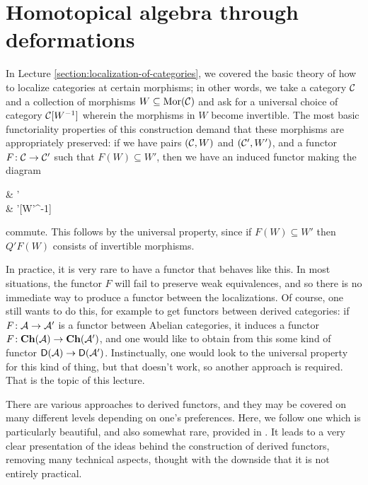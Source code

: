 
\section{Homotopical algebra through deformations}
In Lecture \ref{section:localization-of-categories}, we covered the basic theory of how to localize categories at certain morphisms; in other words, we take a category \(\mathcal{C}\) and
a collection of morphisms \(W\subseteq\operatorname{Mor}(\mathcal{C})\) and ask for a universal choice of category \(\mathcal{C}[W^{-1}]\) wherein the morphisms in \(W\) become invertible. The most basic functoriality
properties of this construction demand that these morphisms are appropriately preserved: if we have pairs \((\mathcal{C},W)\) and \((\mathcal{C}',W')\), and a functor \(F\!:\mathcal{C}\to\mathcal{C}'\) such that \(F(W)\subseteq W'\),
then we have an induced functor making the diagram
\begin{diagram*}
	\calC\ar[r,"F"]\ar[d,"Q"'] & \calC'\ar[d,"Q'"] \\
	\calC[W^{-1}]\ar[r,dashed] & \calC'[W'^{-1}]
\end{diagram*}
commute. This follows by the universal property, since if \(F(W)\subseteq W'\) then \(Q'F(W)\) consists of invertible morphisms.

In practice, it is very rare to have a functor that behaves like this. In most situations, the functor \(F\) will fail to preserve weak equivalences, and so there is no immediate way
to produce a functor between the localizations. Of course, one still wants to do this, for example to get functors between derived categories: if \(F\!:\mathcal{A}\to\mathcal{A}'\) is a functor
between Abelian categories, it induces a functor \(F\!:\mathbf{Ch}(\mathcal{A})\to\mathbf{Ch}(\mathcal{A}')\), and one would like to obtain from this some kind of functor \(\mathsf{D}(\mathcal{A})\to\mathsf{D}(\mathcal{A}')\). Instinctually,
one would look to the universal property for this kind of thing, but that doesn't work, so another approach is required. That is the topic of this lecture.

There are various approaches to derived functors, and they may be covered on many different levels depending on one's preferences. Here, we follow one which is particularly beautiful, and also
somewhat rare, provided in \cite{riehl-categorical-homotopy-theory}. It leads to a very clear presentation of the ideas behind the construction of derived functors,
removing many technical aspects, thought with the downside that it is not entirely practical.

